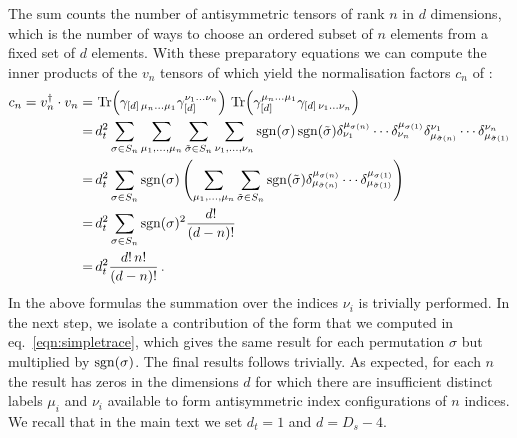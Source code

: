 The sum counts the number of antisymmetric tensors of
rank $n$ in $d$ dimensions, which is the number of ways to 
choose an ordered subset of $n$ elements from a fixed set of $d$
elements.
%
With these preparatory equations we can
compute the inner products of the $v_n$ tensors of 
which yield the normalisation factors $c_n$
of :
\begin{align}
  \begin{split}
    \label{eq:cnCalc}
    c_n=v_n^\dagger\cdot v_n =&\,
%
    \Tr(\gamma_{[d]\,\mu_n \ldots \mu_1} \gamma_{[d]}^
    {\nu_1 \ldots \nu_n}) \,
%
    \Tr(\gamma_{[d]}^{\mu_n \ldots \mu_1} \gamma_{
    [d]\,\nu_1 \ldots \nu_n}) \\
    =&\,
    d_t^2 \sum_{\sigma\in  S_n} 
    \sum_{\mu_1,\ldots,\mu_n}
    \sum_{\tilde \sigma\in S_n}
    \sum_{\nu_1,\ldots,\nu_n}
%
    \sgn(\sigma)
    \sgn(\tilde\sigma)
    \delta^{\mu_{\sigma(n)}}_{\nu_1}\cdots\delta^{\mu_{\sigma(1)}}_{\nu_n}
    \delta_{\mu_{\tilde\sigma(n)}}^{\nu_1}\cdots
    \delta_{\mu_{\tilde\sigma(1)}}^{\nu_n}
    \\
%
    =&\,d_t^2 \sum_{\sigma\in  S_n} 
    \sgn(\sigma)
    \left(
    \sum_{\mu_1,\ldots,\mu_n}\sum_{\tilde \sigma\in S_n}
%
    \sgn(\tilde\sigma)
    \delta^{\mu_{\sigma(n)}}_{\mu_{\tilde\sigma(n)}}
    \cdots
    \delta^{\mu_{\sigma(1)}}_{\mu_{\tilde\sigma(1)}}
    \right)
    \\
%
    =&\, d_t^2 \sum_{\sigma\in  S_n} 
    \sgn(\sigma)^2 \frac{d!}{(d-n)!}\\
    =&\, d_t^2 \frac{d!\,n!}{(d-n)!}\,.
  \end{split}
\end{align}
In the above formulas the summation over the indices $\nu_i$ is 
trivially performed. In the next step, we isolate a contribution
of the form that we computed in eq.~\eqref{eqn:simpletrace},
which gives the same result for each permutation $\sigma$ but
multiplied by $\operatorname{sgn}(\sigma)$. The final results follows
trivially.
As expected, for each $n$ the result has zeros in the dimensions
$d$ for which there are insufficient distinct labels 
$\mu_i$ and $\nu_i$ available to form antisymmetric index 
configurations of $n$ indices.
We recall that in the main text we set $d_t=1$ and $d=D_s-4$.


